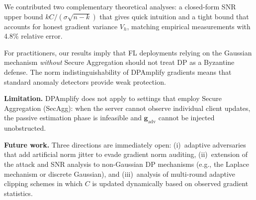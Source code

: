 \documentclass[conference]{IEEEtran}
\begin{document}
We contributed two complementary theoretical analyses: a closed-form
SNR upper bound $kC/(\sigma\sqrt{n-k})$ that gives quick intuition and
a tight bound that accounts for honest gradient variance $V_h$, matching
empirical measurements with 4.8\% relative error.

For practitioners, our results imply that FL deployments relying on
the Gaussian mechanism \emph{without} Secure Aggregation should not
treat DP as a Byzantine defense. The norm indistinguishability of
DPAmplify gradients means that standard anomaly detectors provide
weak protection.

\textbf{Limitation.} DPAmplify does not apply to settings that employ
Secure Aggregation (SecAgg): when the server cannot observe individual
client updates, the passive estimation phase is infeasible and
$\mathbf{g}_{\mathrm{adv}}$ cannot be injected unobstructed.

\textbf{Future work.} Three directions are immediately open: (i)~adaptive
adversaries that add artificial norm jitter to evade gradient norm
auditing, (ii)~extension of the attack and SNR analysis to non-Gaussian
DP mechanisms (e.g., the Laplace mechanism or discrete Gaussian), and
(iii)~analysis of multi-round adaptive clipping schemes in which $C$ is
updated dynamically based on observed gradient statistics.



\end{document}

